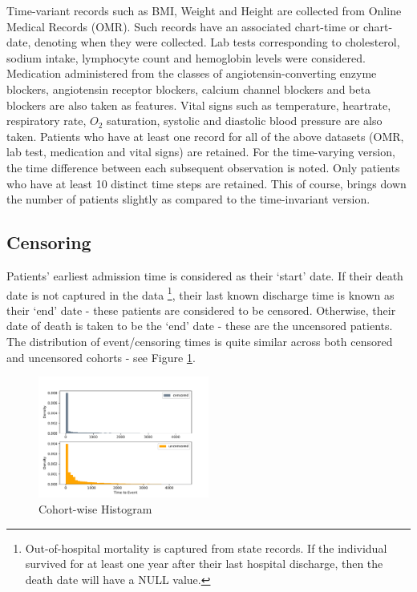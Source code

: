 \documentclass[%
 reprint,
 amsmath,amssymb,
 aps,nofootinbib
]{revtex4-2}
\begin{document}
Time-variant records such as BMI, Weight and Height are collected from Online Medical Records (OMR). Such records have an associated chart-time or chart-date, denoting when they were collected. Lab tests corresponding to cholesterol, sodium intake, lymphocyte count and hemoglobin levels were considered. Medication administered from the classes of angiotensin-converting enzyme blockers, angiotensin receptor blockers, calcium channel blockers and beta blockers are also taken as features. Vital signs such as temperature, heartrate, respiratory rate, $O_2$ saturation, systolic and diastolic blood pressure are also taken. Patients who have at least one record for all of the above datasets (OMR, lab test, medication and vital signs) are retained. For the time-varying version, the time difference between each subsequent observation is noted. Only patients who have at least 10 distinct time steps are retained. This of course, brings down the number of patients slightly as compared to the time-invariant version.

\subsection{\label{censoring}Censoring}
Patients' earliest admission time is considered as their `start' date. If their death date is not captured in the data \footnote{Out-of-hospital mortality is captured from state records. If the individual survived for at least one year after their last hospital discharge, then the death date will have a NULL value.}, their last known discharge time is known as their `end' date - these patients are considered to be censored. Otherwise, their date of death is taken to be the `end' date - these are the uncensored patients. The distribution of event/censoring times is quite similar across both censored and uncensored cohorts - see Figure \ref{fig:cohort_hist}.

\begin{figure}[H]
  \centering
  \includegraphics[width=0.5\textwidth]{cohort_hist.pdf}
  \caption{Cohort-wise Histogram}
  \label{fig:cohort_hist}
\end{figure}
\end{document}

